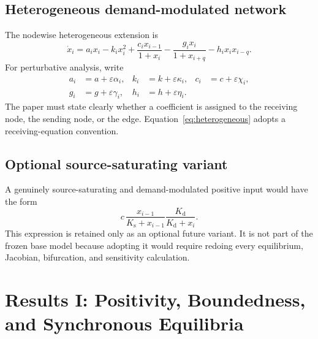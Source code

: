 \documentclass[11pt, reqno]{amsart}
\theoremstyle{definition}
\theoremstyle{remark}
\newcommand{\eps}{\varepsilon}
\begin{document}

\subsection{Heterogeneous demand-modulated network}

The nodewise heterogeneous extension is
\begin{equation}
\label{eq:heterogeneous}
\dot x_i
=
 a_i x_i-k_i x_i^2
 +\frac{c_i x_{i-1}}{1+x_i}
 -\frac{g_i x_i}{1+x_{i+q}}
 -h_i x_i x_{i-q}.
\end{equation}
For perturbative analysis, write
\begin{equation}
\label{eq:hetero-expansion}
\begin{aligned}
    a_i&=a+\eps\alpha_i,
    &k_i&=k+\eps\kappa_i,
    &c_i&=c+\eps\chi_i,\\
    g_i&=g+\eps\gamma_i,
    &h_i&=h+\eps\eta_i.
\end{aligned}
\end{equation}
The paper must state clearly whether a coefficient is assigned to the receiving
node, the sending node, or the edge.  Equation~\eqref{eq:heterogeneous} adopts a
receiving-equation convention.

\subsection{Optional source-saturating variant}

A genuinely source-saturating and demand-modulated positive input would have
the form
\begin{equation}
\label{eq:true-saturation-candidate}
    c\,
    \frac{x_{i-1}}{K_{\mathrm s}+x_{i-1}}
    \frac{K_{\mathrm d}}{K_{\mathrm d}+x_i}.
\end{equation}
This expression is retained only as an optional future variant.  It is not part
of the frozen base model because adopting it would require redoing every
equilibrium, Jacobian, bifurcation, and sensitivity calculation.


\section{Results I: Positivity, Boundedness, and Synchronous Equilibria}
\label{sec:global}
\end{document}
